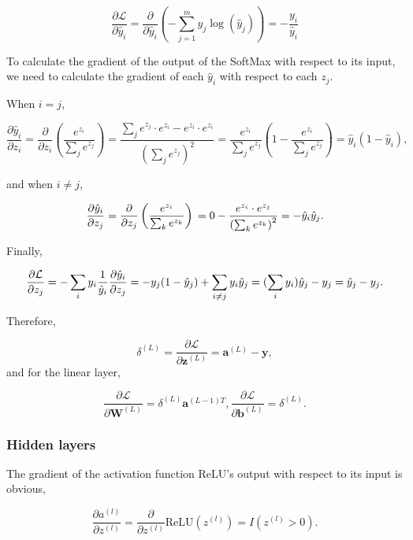 \documentclass[12pt]{article}
\begin{document}
$$
\frac{\partial \mathcal{L}}{\partial \hat{y}_i} = \frac{\partial}{\partial \hat{y}_i}(-\sum_{j=1}^{m} y_j \log(\hat{y}_j)) = -\frac{y_i}{\hat{y}_i}
$$

To calculate the gradient of the output of the SoftMax with respect to its input, we need to calculate the gradient of each $\hat{y}_i$ with respect to each $z_j$.

When $i = j$,

$$
\frac{\partial \hat{y}_i}{\partial z_i}
= \frac{\partial}{\partial z_i} \left( \frac{e^{z_i}}{\sum_{j} e^{z_j}} \right)
= \frac{\sum_{j} e^{z_j} \cdot e^{z_i} - e^{z_i} \cdot e^{z_i}}{\left( \sum_{j} e^{z_j} \right)^2}
= \frac{e^{z_i}}{\sum_{j} e^{z_j}} \left( 1 - \frac{e^{z_i}}{\sum_{j} e^{z_j}} \right)
= \hat{y}_i (1 - \hat{y}_i),
$$

and when $i \neq j$,

$$
\frac{\partial \hat{y}_i}{\partial z_j}
= \frac{\partial}{\partial z_j} \left( \frac{e^{z_i}}{\sum_{k} e^{z_k}} \right)\\
= 0 - \frac{e^{z_i} \cdot e^{z_j}}{\left( \sum_{k} e^{z_k} \right)^2}\\
= - \hat{y}_i \hat{y}_j.
$$

Finally,

$$
\frac{\partial \mathcal{L}}{\partial z_j}
= -\sum_i y_i \frac{1}{\hat{y}_i} \frac{\partial \hat{y}_i}{\partial z_j}\\
= -y_j (1 - \hat{y}_j) + \sum_{i \neq j} y_i \hat{y}_j\\
= (\sum_i y_i)\hat{y}_j - y_j\\
= \hat{y}_j - y_j.
$$

Therefore,

$$
\delta^{(L)} = \frac{\partial \mathcal{L}}{\partial \mathbf{z}^{(L)}} = \mathbf{a}^{(L)} - \mathbf{y},
$$ and for the linear layer,

$$
\frac{\partial \mathcal{L}}{\partial \mathbf{W}^{(L)}} = \delta^{(L)} \mathbf{a}^{(L-1)T}, \frac{\partial \mathcal{L}}{\partial \mathbf{b}^{(L)}} = \delta^{(L)}.
$$

\subsubsection{Hidden layers}

The gradient of the activation function ReLU's output with respect to its input is obvious,

$$
\frac{\partial a^{(l)}}{\partial z^{(l)}} = \frac{\partial}{\partial z^{(l)}}\text{ReLU}(z^{(l)}) = I(z^{(l)} > 0).
$$
\end{document}
